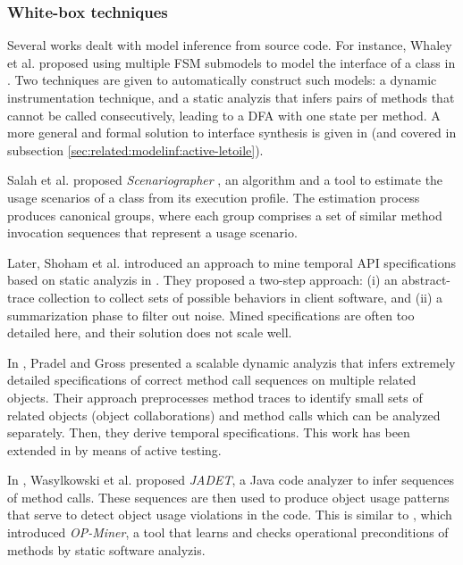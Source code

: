 \subsubsection{White-box techniques}
\label{sec:related:modelinf:passive-white}

Several works dealt with model inference from source code. For
instance, Whaley et al. proposed using multiple FSM submodels to
model the interface of a class in
\cite{Whaley:2002:AEO:566171.566212}. Two techniques are given to
automatically construct such models: a dynamic instrumentation
technique, and a static analyzis that infers pairs of methods
that cannot be called consecutively, leading to a DFA with one
state per method. A more general and formal solution to interface
synthesis is given in \cite{Alur:2005:SIS:1047659.1040314} (and
covered in subsection \ref{sec:related:modelinf:active-letoile}).

Salah et al. proposed \textit{Scenariographer}
\cite{Salah05scenariographer}, an algorithm and a tool to
estimate the usage scenarios of a class from its execution
profile. The estimation process produces canonical groups, where
each group comprises a set of similar method invocation sequences
that represent a usage scenario.

Later, Shoham et al. introduced an approach to mine temporal API
specifications based on static analyzis in
\cite{Shoham:2007:SSM:1273463.1273487}. They proposed a two-step
approach: (i) an abstract-trace collection to collect sets of
possible behaviors in client software, and (ii) a summarization
phase to filter out noise. Mined specifications are often too
detailed here, and their solution does not scale well.

In \cite{Pradel:2009}, Pradel and Gross presented a scalable
dynamic analyzis that infers extremely detailed specifications of
correct method call sequences on multiple related objects. Their
approach preprocesses method traces to identify small sets of
related objects (object collaborations) and method calls which
can be analyzed separately. Then, they derive temporal
specifications. This work has been extended in
\cite{Dallmeier_generatingtest} by means of active testing.

In \cite{Wasylkowski07detectingobject}, Wasylkowski et al.
proposed \textit{JADET}, a Java code analyzer to infer sequences
of method calls. These sequences are then used to produce object
usage patterns that serve to detect object usage violations in
the code. This is similar to
\cite{Wasylkowski_miningoperational}, which introduced
\textit{OP-Miner}, a tool that learns and checks operational
preconditions of methods by static software analyzis.

